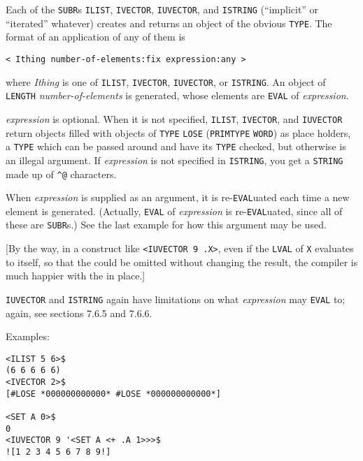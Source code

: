 \documentclass[a4paper]{scrbook}
\begin{document}
Each of the \texttt{SUBR}s \texttt{ILIST}, \texttt{IVECTOR},
\texttt{IUVECTOR}, and \texttt{ISTRING} (``implicit'' or
``iterated'' whatever) creates and returns an object of the obvious \texttt{TYPE}. The format of an application of any of
them is

\begin{verbatim}
< Ithing number-of-elements:fix expression:any >
\end{verbatim}

where \emph{Ithing} is one of \texttt{ILIST}, \texttt{IVECTOR}, \texttt{IUVECTOR}, or \texttt{ISTRING}. An object of
\texttt{LENGTH} \emph{number-of-elements} is generated, whose elements are \texttt{EVAL} of \emph{expression}.

\emph{expression} is optional. When it is not specified, \texttt{ILIST}, \texttt{IVECTOR}, and \texttt{IUVECTOR} return
objects filled with objects of \texttt{TYPE} \texttt{LOSE} (\texttt{PRIMTYPE} \texttt{WORD}) as place
holders, a \texttt{TYPE} which can be passed around and have its \texttt{TYPE} checked, but otherwise is an illegal
argument. If \emph{expression} is not specified in \texttt{ISTRING}, you get a \texttt{STRING} made up of
\texttt{\^{}@} characters.

When \emph{expression} is supplied as an argument, it is re-\texttt{EVAL}uated each time a new element is generated.
(Actually, \texttt{EVAL} of \emph{expression} is re-\texttt{EVAL}uated, since all of these are \texttt{SUBR}s.) See the
last example for how this argument may be used.

{[}By the way, in a construct like \texttt{\textless{}IUVECTOR\ 9\ \textquotesingle{}.X\textgreater{}}, even if the
\texttt{LVAL} of \texttt{X} evaluates to itself, so that the \texttt{\textquotesingle{}} could be omitted without changing
the result, the compiler is much happier with the \texttt{\textquotesingle{}} in place.{]}

\texttt{IUVECTOR} and \texttt{ISTRING} again have limitations on what \emph{expression} may \texttt{EVAL} to; again, see
sections 7.6.5 and 7.6.6.

Examples:

\begin{verbatim}
<ILIST 5 6>$
(6 6 6 6 6)
<IVECTOR 2>$
[#LOSE *000000000000* #LOSE *000000000000*]

<SET A 0>$
0
<IUVECTOR 9 '<SET A <+ .A 1>>>$
![1 2 3 4 5 6 7 8 9!]
\end{verbatim}
\end{document}
